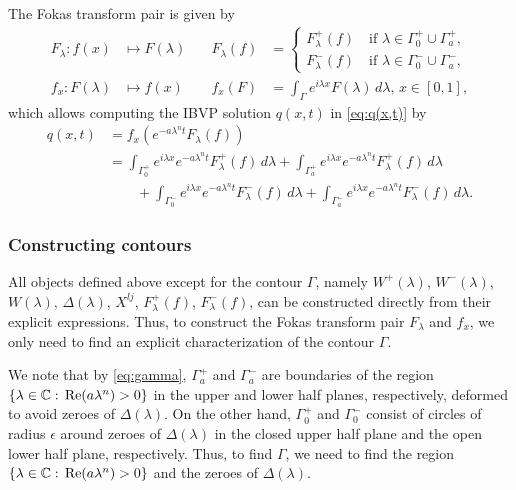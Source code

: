 \documentclass[11pt, oneside, a4paper]{article}
\begin{document}
The Fokas transform pair is given by
\begin{subequations}\label{eq:fokas_transform_pair}
    \begin{alignat}{3}
        F_\lambda: f(x)&\mapsto F(\lambda)\quad &F_\lambda(f) &= \begin{cases}F^+_\lambda(f)\quad\mbox{if $\lambda\in \Gamma_0^+\cup \Gamma_a^+$},\\F^-_\lambda(f)\quad\mbox{if $\lambda\in \Gamma_0^-\cup \Gamma_a^-$},\end{cases} \label{eq:F_lambda}\\
        f_x:F(\lambda)&\mapsto f(x)\quad &f_x(F) &= \int_\Gamma e^{i\lambda x} F(\lambda)\,d\lambda,\, x\in [0,1], \label{eq:f_x}
    \end{alignat}
\end{subequations}
which allows computing the IBVP solution $q(x,t)$ in \eqref{eq:q(x,t)} by
\begin{equation}\label{eq:q(x,t)_explicit}
    \begin{split}
        q(x,t) &= f_x\left(e^{-a\lambda^n t}F_\lambda(f)\right)\\
        &= \int_{\Gamma_0^+}e^{i\lambda x}e^{-a\lambda^n t}F_\lambda^+(f)\,d\lambda + \int_{\Gamma_a^+}e^{i\lambda x}e^{-a\lambda^n t}F_\lambda^+(f)\,d\lambda\\
        &\qquad + \int_{\Gamma_0^-}e^{i\lambda x}e^{-a\lambda^n t}F_\lambda^-(f)\,d\lambda + \int_{\Gamma_a^-}e^{i\lambda x}e^{-a\lambda^n t}F_\lambda^-(f)\,d\lambda.
    \end{split}
\end{equation}

\subsubsection{Constructing contours}\label{sec:constructing_contours}
All objects defined above except for the contour $\Gamma$, namely $W^+(\lambda)$, $W^-(\lambda)$, $W(\lambda)$, $\Delta(\lambda)$, $X^{lj}$, $F^+_\lambda(f)$, $F^-_\lambda(f)$, can be constructed directly from their explicit expressions. Thus, to construct the Fokas transform pair $F_\lambda$ and $f_x$, we only need to find an explicit characterization of the contour $\Gamma$.

We note that by \eqref{eq:gamma}, $\Gamma_a^+$ and $\Gamma_a^-$ are boundaries of the region $\{\lambda\in\mathbb C:\, \mathrm{Re}(a\lambda^n)>0\}$ in the upper and lower half planes, respectively, deformed to avoid zeroes of $\Delta(\lambda)$. On the other hand, $\Gamma_0^+$ and $\Gamma_0^-$ consist of circles of radius $\epsilon$ around zeroes of $\Delta(\lambda)$ in the closed upper half plane and the open lower half plane, respectively. Thus, to find $\Gamma$, we need to find the region $\{\lambda\in\mathbb C:\, \mathrm{Re}(a\lambda^n)>0\}$ and the zeroes of $\Delta(\lambda)$.
\end{document}
